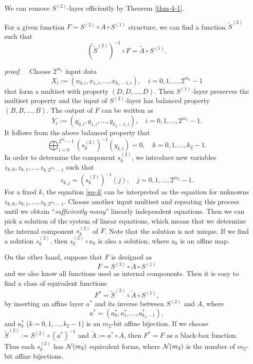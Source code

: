 \documentclass{ieeeaccess}
\begin{document}
We can remove $S^{(2)}$-layer efficiently by Theorem \ref{thm-4-1}.
\begin{theorem}\label{thm-4-1}
For a given function $F = S^{(2)}\circ A\circ S^{(1)}$ structure,
we can find a function $\tilde{S}^{(2)}$ such that
\[
({\tilde{S}^{(2)}})^{-1} \circ F = \tilde A \circ S^{(1)}.
\]
\end{theorem}
{\it proof. \ } 
Choose $2^{m_1}$ input data %
\[
X_i := (x_{0,i}, x_{1,i}, \ldots, x_{k_1-1,i}), \quad i=0,1,\ldots, 2^{m_1}-1
\]
that form a multiset with property
$(D, D, \ldots, D)$.
Then $S^{(1)}$-layer preserves the multiset property and
the input of $S^{(2)}$-layer has balanced property $(B,B,\ldots, B)$.
The output of $F$ can be written as
\[
Y_i:=(y_{0,i}, y_{1,i}, \ldots, y_{k_2-1,i}), \quad i=0,1,\ldots, 2^{m_1}-1.
\]
It follows from the above balanced property that
\begin{equation}\label{eq-4}
\bigoplus_{i=0}^{2^{m_1}-1} (s_k^{(2)})^{-1}(y_{k,i}) = 0, \quad
k=0,1,\ldots, k_2-1.
\end{equation}
In order to determine the component $s_k^{(2)}$, we introduce new variables
$z_{k,0}, z_{k,1}, \ldots, z_{k,2^{m_2}-1}$ such that
\[
z_{k,j} = (s_k^{(2)})^{-1}(j), \quad j=0,1,\ldots, 2^{m_2}-1.
\]
For a fixed $k$, the equation \eqref{eq-4} can be interpreted as
the equation for unknowns $z_{k,0}, z_{k,1}, \ldots, z_{k,2^{m_2}-1}$.
Choose another input multiset and repeating this process 
until we obtain ``{\it sufficiently many}'' linearly independent equations.
Then we can pick a solution of the system of linear equations,
which means that we determine the internal component $s_k^{(2)}$ of $F$.
Note that the solution is not unique. If we find a solution $s_k^{(2)}$,
then  $s_k^{(2)}\circ a_k$ is also a solution, where $a_k$ is an affine map.


On the other hand, suppose that $F$ is designed as
\[
F= S^{(2)}\circ A\circ S^{(1)}
\]
and we also know all functions used as internal components.
Then it is easy to find a class of equivalent functions
\begin{equation}\label{eq-5}
F^* = \tilde S^{(2)} \circ \tilde A \circ S^{(1)},
\end{equation}
by inserting an affine layer $a^*$ and its inverse between $S^{(2)}$ and $A$,
where
\[
a^* = (a_0^*, a_1^*, \ldots, a_{k_2-1}^*),
\]
and $a_ k^*$ ($k=0,1,\ldots, k_2-1$) is an $m_2$-bit affine bijection.
If we choose $\tilde S^{(2)} := S^{(2)} \circ (a^*)^{-1}$ and $\tilde A := a^*\circ A$,
then $F^* = F$ as a black-box function.
Thus each $s_k^{(2)}$ has ${\cal N}(m_2)$ equivalent forms,
where ${\cal N}(m_2)$ is the number of $m_2$-bit affine bijections.
\end{document}
